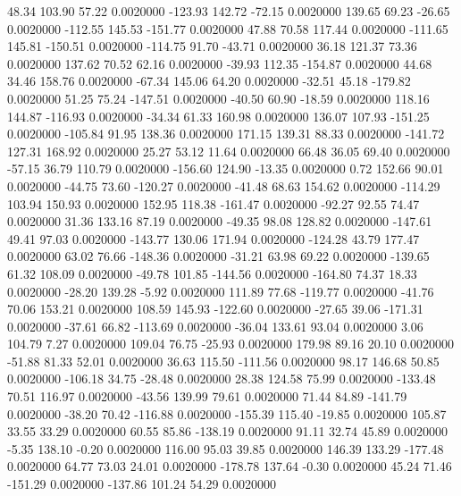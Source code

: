    48.34  103.90   57.22   0.0020000
 -123.93  142.72  -72.15   0.0020000
  139.65   69.23  -26.65   0.0020000
 -112.55  145.53 -151.77   0.0020000
   47.88   70.58  117.44   0.0020000
 -111.65  145.81 -150.51   0.0020000
 -114.75   91.70  -43.71   0.0020000
   36.18  121.37   73.36   0.0020000
  137.62   70.52   62.16   0.0020000
  -39.93  112.35 -154.87   0.0020000
   44.68   34.46  158.76   0.0020000
  -67.34  145.06   64.20   0.0020000
  -32.51   45.18 -179.82   0.0020000
   51.25   75.24 -147.51   0.0020000
  -40.50   60.90  -18.59   0.0020000
  118.16  144.87 -116.93   0.0020000
  -34.34   61.33  160.98   0.0020000
  136.07  107.93 -151.25   0.0020000
 -105.84   91.95  138.36   0.0020000
  171.15  139.31   88.33   0.0020000
 -141.72  127.31  168.92   0.0020000
   25.27   53.12   11.64   0.0020000
   66.48   36.05   69.40   0.0020000
  -57.15   36.79  110.79   0.0020000
 -156.60  124.90  -13.35   0.0020000
    0.72  152.66   90.01   0.0020000
  -44.75   73.60 -120.27   0.0020000
  -41.48   68.63  154.62   0.0020000
 -114.29  103.94  150.93   0.0020000
  152.95  118.38 -161.47   0.0020000
  -92.27   92.55   74.47   0.0020000
   31.36  133.16   87.19   0.0020000
  -49.35   98.08  128.82   0.0020000
 -147.61   49.41   97.03   0.0020000
 -143.77  130.06  171.94   0.0020000
 -124.28   43.79  177.47   0.0020000
   63.02   76.66 -148.36   0.0020000
  -31.21   63.98   69.22   0.0020000
 -139.65   61.32  108.09   0.0020000
  -49.78  101.85 -144.56   0.0020000
 -164.80   74.37   18.33   0.0020000
  -28.20  139.28   -5.92   0.0020000
  111.89   77.68 -119.77   0.0020000
  -41.76   70.06  153.21   0.0020000
  108.59  145.93 -122.60   0.0020000
  -27.65   39.06 -171.31   0.0020000
  -37.61   66.82 -113.69   0.0020000
  -36.04  133.61   93.04   0.0020000
    3.06  104.79    7.27   0.0020000
  109.04   76.75  -25.93   0.0020000
  179.98   89.16   20.10   0.0020000
  -51.88   81.33   52.01   0.0020000
   36.63  115.50 -111.56   0.0020000
   98.17  146.68   50.85   0.0020000
 -106.18   34.75  -28.48   0.0020000
   28.38  124.58   75.99   0.0020000
 -133.48   70.51  116.97   0.0020000
  -43.56  139.99   79.61   0.0020000
   71.44   84.89 -141.79   0.0020000
  -38.20   70.42 -116.88   0.0020000
 -155.39  115.40  -19.85   0.0020000
  105.87   33.55   33.29   0.0020000
   60.55   85.86 -138.19   0.0020000
   91.11   32.74   45.89   0.0020000
   -5.35  138.10   -0.20   0.0020000
  116.00   95.03   39.85   0.0020000
  146.39  133.29 -177.48   0.0020000
   64.77   73.03   24.01   0.0020000
 -178.78  137.64   -0.30   0.0020000
   45.24   71.46 -151.29   0.0020000
 -137.86  101.24   54.29   0.0020000
